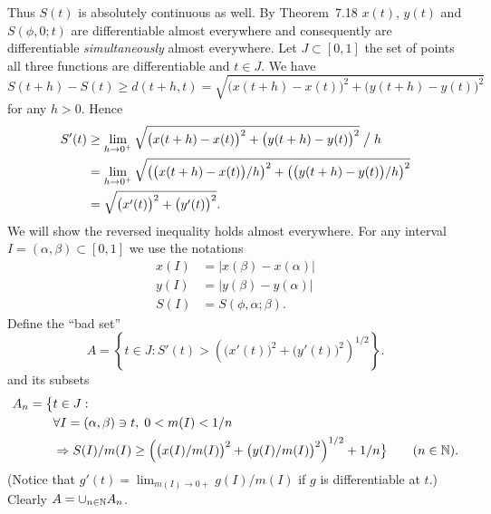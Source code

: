 \begin{enumerate}
\begin{thmproof}
Thus \(S(t)\) is absolutely continuous as well.
By Theorem~7.18 \cite{RudinRCA87} \(x(t)\), \(y(t)\) and \(S(\phi,0;t)\)
are differentiable almost everywhere and consequently
are differentiable \emph{simultaneously} almost everywhere.
Let \(J\subset[0,1]\)
the set of points all three functions are differentiable
and \(t\in J\).
We have
\begin{equation*}
S(t+h) -S(t) 
\geq d(t+h,t) 
= \sqrt{\bigl(x(t+h) - x(t)\bigr)^2 + \bigl(y(t+h) - y(t)\bigr)^2}
\end{equation*}
for any \(h>0\). Hence
\begin{align*}
S'(t)
&\geq \lim_{h\to 0^+}  
   \sqrt{\bigl(x(t+h) - x(t)\bigr)^2 + \bigl(y(t+h) - y(t)\bigr)^2} \bigm/ h \\
&= \lim_{h\to 0^+}  
   \sqrt{\left(\bigl(x(t+h) - x(t)\bigr)/h\right)^2 + 
         \left(\bigl(y(t+h) - y(t)\bigr)/h\right)^2}  \\
&= \sqrt{\bigl(x'(t)\bigr)^2 + \bigl(y'(t)\bigr)^2}.
\end{align*}
We will show the reversed inequality holds almost everywhere.
For any interval \(I=(\alpha,\beta)\subset[0,1]\) we use the notations
\begin{align*}
x(I) &= |x(\beta) - x(\alpha)| \\
y(I) &= |y(\beta) - y(\alpha)| \\
S(I) &= S(\phi,\alpha;\beta). 
\end{align*}
Define the ``bad set''
\begin{equation*}
A = \left\{t\in J: 
        S'(t) > \left(\bigl(x'(t)\bigr)^2 + \bigl(y'(t)\bigr)^2\right)^{1/2}
        \right\}. 
\end{equation*}
and its subsets
\begin{align}
A_n = \bigl\{ & t\in J:   \notag \\
      & \forall I=(\alpha,\beta)\ni t,\; 0<m(I) < 1/n  \notag \\
      & \Rightarrow  \label{eq:7.21:An}
        S(I)/m(I)
        \geq \left(
                \bigl(x(I)/m(I)\bigr)^2 + \bigl(y(I)/m(I)\bigr)^2
             \right)^{1/2} + 1/n
        \bigr\}
\qquad (n\in\mathbb{N}).
\end{align}
(Notice that \(g'(t) = \lim_{m(I)\to 0+} g(I)/m(I)\)
if $g$ is differentiable at $t$.)
Clearly \(A = \cup_{n\in\mathbb{N}} A_n\).


\end{thmproof}
\end{enumerate}
